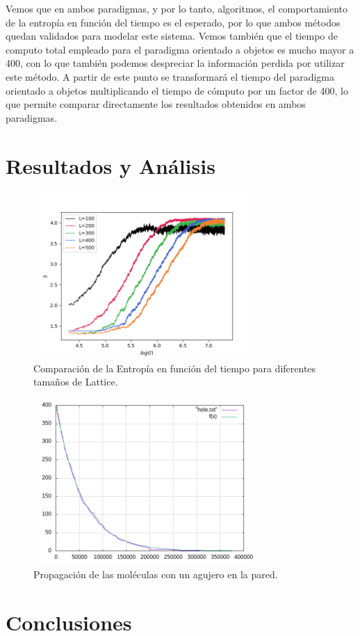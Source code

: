 \documentclass[12pt,twocolumn]{article}
\begin{document}
Vemos que en ambos paradigmas, y por lo tanto, algoritmos, el comportamiento de la entropía 
en función del tiempo es el esperado, por lo que ambos métodos quedan validados para modelar 
este sistema. Vemos también que el tiempo de computo total empleado para el paradigma orientado 
a objetos es mucho mayor a 400, con lo que también podemos despreciar la información perdida 
por utilizar este método. A partir de este punto se transformará el tiempo del paradigma 
orientado a objetos multiplicando el tiempo de cómputo por un factor de 400, lo que permite 
comparar directamente los resultados obtenidos en ambos paradigmas.

\section{Resultados y Análisis}

\begin{figure}
    \centering
    \includegraphics[width=0.75\textwidth]{figs/S_vs_t_sizes.png}
    \caption{Comparación de la Entropía en función del tiempo para diferentes tamaños de Lattice.}
    \label{fig:hole}
\end{figure}

\begin{figure}
    \centering
    \includegraphics[width=0.75\textwidth]{figs/hole.png}
    \caption{Propagación de las moléculas con un agujero en la pared.}
    \label{fig:hole}
\end{figure}




\section{Conclusiones}
\end{document}
